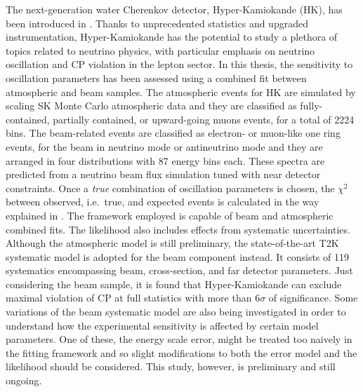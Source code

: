 The next-generation water Cherenkov detector, Hyper-Kamiokande (HK), has been introduced in .
Thanks to unprecedented statistics and upgraded instrumentation, Hyper-Kamiokande has the potential %
to study a plethora of topics related to neutrino physics, %
with particular emphasis on neutrino oscillation and CP violation in the lepton sector.
In this thesis, the sensitivity to oscillation parameters has been assessed %
using a combined fit between atmospheric and beam samples.
The atmospheric events for HK are simulated by scaling SK Monte Carlo atmospheric data %
and they are classified as fully-contained, partially contained, or upward-going muons events, for a total of 2224 bins.
The beam-related events are classified as electron- or muon-like one ring events, %
for the beam in neutrino mode or antineutrino mode and they are arranged in four distributions with 87 energy bins each.
These spectra are predicted from a neutrino beam flux simulation tuned with near detector constraints.
Once a \emph{true} combination of oscillation parameters is chosen, the $\chi^2$ between observed, i.e.\ true, %
and expected events is calculated in the way explained in .
The framework employed is capable of beam and atmospheric combined fits.
The likelihood also includes effects from systematic uncertainties.
Although the atmospheric model is still preliminary, the state-of-the-art T2K systematic model %
is adopted for the beam component instead.
It consists of 119 systematics encompassing beam, cross-section, and far detector parameters.
Just considering the beam sample, it is found that Hyper-Kamiokande can exclude maximal %
violation of CP at full statistics with more than $6\sigma$ of significance.
Some variations of the beam systematic model are also being investigated in order to understand %
how the experimental sensitivity is affected by certain model parameters. 
One of these, the energy scale error, might be treated too naively in the fitting framework %
and so slight modifications to both the error model and the likelihood should be considered.
This study, however, is preliminary and still ongoing.


